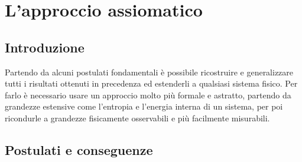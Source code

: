 \documentclass{article}
\begin{document}
\newpage
\section{L'approccio assiomatico}

\subsection{Introduzione}
Partendo da alcuni postulati fondamentali è possibile ricostruire e generalizzare tutti i risultati ottenuti in precedenza ed estenderli a qualsiasi sistema fisico. Per farlo è necessario usare un approccio molto più formale e astratto, partendo da grandezze estensive come l'entropia e l'energia interna di un sistema, per poi ricondurle a grandezze fisicamente osservabili e più facilmente misurabili.


\subsection{Postulati e conseguenze}
\end{document}
